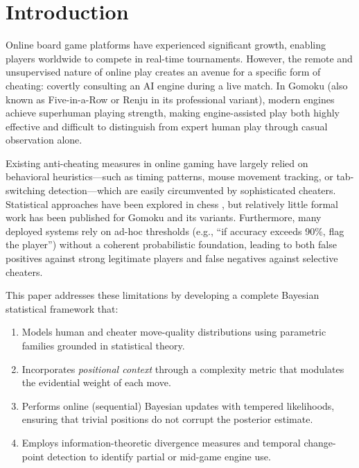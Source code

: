 \documentclass[11pt,a4paper]{article}
\begin{document}
\section{Introduction}
\label{sec:introduction}

Online board game platforms have experienced significant growth, enabling
players worldwide to compete in real-time tournaments. However, the remote and
unsupervised nature of online play creates an avenue for a specific form of
cheating: covertly consulting an AI engine during a live match. In Gomoku
(also known as Five-in-a-Row or Renju in its professional variant), modern
engines achieve superhuman playing strength, making engine-assisted play both
highly effective and difficult to distinguish from expert human play through
casual observation alone.

Existing anti-cheating measures in online gaming have largely relied on
behavioral heuristics---such as timing patterns, mouse movement tracking, or
tab-switching detection---which are easily circumvented by sophisticated
cheaters. Statistical approaches have been explored in chess
\citep{regan2011intrinsic}, but relatively little formal work has been published
for Gomoku and its variants. Furthermore, many deployed systems rely on ad-hoc
thresholds (e.g., ``if accuracy exceeds 90\%, flag the player'') without a
coherent probabilistic foundation, leading to both false positives against
strong legitimate players and false negatives against selective cheaters.

This paper addresses these limitations by developing a complete Bayesian
statistical framework that:

\begin{enumerate}[label=(\roman*)]
    \item Models human and cheater move-quality distributions using parametric
          families grounded in statistical theory.
    \item Incorporates \emph{positional context} through a complexity metric
          that modulates the evidential weight of each move.
    \item Performs online (sequential) Bayesian updates with tempered
          likelihoods, ensuring that trivial positions do not corrupt the
          posterior estimate.
    \item Employs information-theoretic divergence measures and temporal
          change-point detection to identify partial or mid-game engine use.
\end{enumerate}
\end{document}
